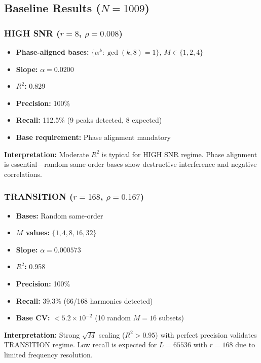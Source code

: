 \subsection{Baseline Results ($N=1009$)}

\subsubsection{HIGH SNR ($r=8$, $\rho=0.008$)}

\begin{itemize}
    \item \textbf{Phase-aligned bases:} $\{\alpha^k : \gcd(k,8)=1\}$, $M \in \{1,2,4\}$
    \item \textbf{Slope:} $\alpha = 0.0200$
    \item \textbf{$R^2$:} 0.829
    \item \textbf{Precision:} 100\%
    \item \textbf{Recall:} 112.5\% (9 peaks detected, 8 expected)
    \item \textbf{Base requirement:} Phase alignment mandatory
\end{itemize}

\textbf{Interpretation:} Moderate $R^2$ is typical for HIGH SNR regime. Phase alignment is essential---random same-order bases show destructive interference and negative correlations.

\subsubsection{TRANSITION ($r=168$, $\rho=0.167$)}

\begin{itemize}
    \item \textbf{Bases:} Random same-order
    \item \textbf{$M$ values:} $\{1,4,8,16,32\}$
    \item \textbf{Slope:} $\alpha = 0.000573$
    \item \textbf{$R^2$:} 0.958
    \item \textbf{Precision:} 100\%
    \item \textbf{Recall:} 39.3\% (66/168 harmonics detected)
    \item \textbf{Base CV:} $< 5.2 \times 10^{-2}$ (10 random $M=16$ subsets)
\end{itemize}

\textbf{Interpretation:} Strong $\sqrt{M}$ scaling ($R^2 > 0.95$) with perfect precision validates TRANSITION regime. Low recall is expected for $L=65536$ with $r=168$ due to limited frequency resolution.

